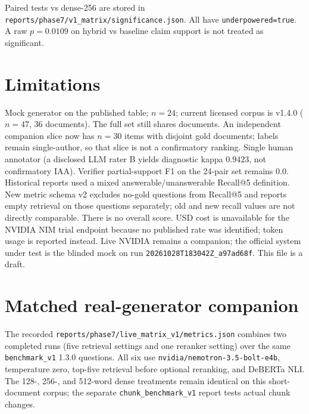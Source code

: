 \documentclass[10pt,twocolumn]{article}
\begin{document}
Paired tests vs dense-256 are stored in \texttt{reports/phase7/v1\_matrix/significance.json}. All have \texttt{underpowered=true}. A raw $p=0.0109$ on hybrid vs baseline claim support is not treated as significant.

\section{Limitations}
Mock generator on the published table; $n=24$; current licensed corpus is v1.4.0 ($n=47$, 36 documents). The full set still shares documents. An independent companion slice now has $n=30$ items with disjoint gold documents; labels remain single-author, so that slice is not a confirmatory ranking. Single human annotator (a disclosed LLM rater B yields diagnostic kappa $0.9423$, not confirmatory IAA). Verifier partial-support F1 on the 24-pair set remains $0.0$. Historical reports used a mixed answerable/unanswerable Recall@5 definition. New metric schema v2 excludes no-gold questions from Recall@5 and reports empty retrieval on those questions separately; old and new recall values are not directly comparable. There is no overall score. USD cost is unavailable for the NVIDIA NIM trial endpoint because no published rate was identified; token usage is reported instead. Live NVIDIA remains a companion; the official system under test is the blinded mock on run \texttt{20261028T183042Z\_a97ad68f}. This file is a draft.

\section{Matched real-generator companion}
\label{sec:live}
The recorded \texttt{reports/phase7/live\_matrix\_v1/metrics.json} combines two completed runs (five retrieval settings and one reranker setting) over the same \texttt{benchmark\_v1} 1.3.0 questions. All six use \texttt{nvidia/nemotron-3.5-bolt-e4b}, temperature zero, top-five retrieval before optional reranking, and DeBERTa NLI. The 128-, 256-, and 512-word dense treatments remain identical on this short-document corpus; the separate \texttt{chunk\_benchmark\_v1} report tests actual chunk changes.
\end{document}
